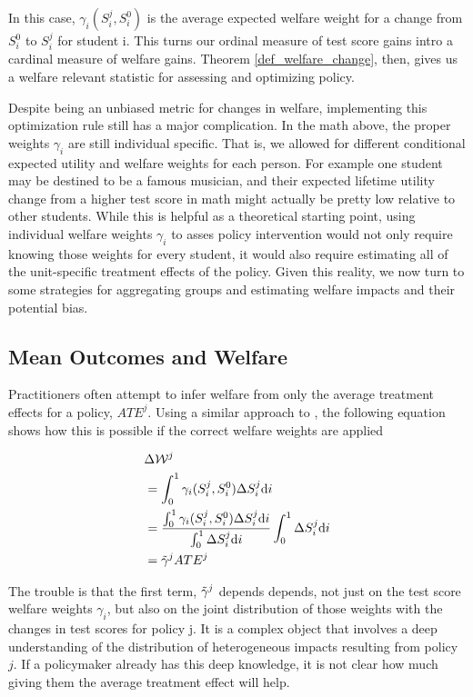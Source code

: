 \documentclass[12pt]{article}
\theoremstyle{definition}
\theoremstyle{definition}
\theoremstyle{definition}
\theoremstyle{definition}
\begin{document}
   
 
    In this case, $\gamma_i(S_i^j, S_i^0) $ is the average expected welfare weight for a change from $S_i^0$ to $S_i^j$ for student i. This turns our ordinal measure of test score gains intro a cardinal measure of welfare gains. Theorem \ref{def_welfare_change}, then, gives us a welfare relevant statistic for assessing and optimizing policy.

 Despite being an unbiased metric for changes in welfare, implementing this optimization rule still has a major complication. In the math above, the proper weights  $\gamma_i$ are still individual specific. That is, we allowed for different conditional expected utility and welfare weights for each person. For example one student may be destined to be a famous musician, and their expected lifetime utility change from a higher test score in math might actually be pretty low relative to other students. While this is helpful as a theoretical starting point, using individual welfare weights  $\gamma_i$ to asses policy intervention would not only require knowing those weights for every student, it would also require estimating all of the unit-specific treatment effects of the policy. Given this reality, we now turn to some strategies for aggregating groups and estimating welfare impacts and their potential bias. 
    
    
    \subsection{Mean Outcomes and Welfare}

    Practitioners often attempt to infer welfare from only the average treatment effects for a policy, $ATE^j$. Using a similar approach to  \cite{Keyser_2020}, the following equation shows how this is possible if the correct welfare weights are applied


    \begin{align}
           & \Delta \mathcal{W}^j \\
           &  = \int_0^1 \gamma_i(S_i^j, S_i^0) \Delta S^j_i \text{d}i\\
           & = \frac{\int_0^1 \gamma_i(S_i^j, S_i^0) \Delta S^j_i \text{d}i}{\int_0^1 \Delta S^j_i \text{d}i} \int_0^1 \Delta S^j_i \text{d}i \\
           & =  \Tilde{\gamma}^j ATE^j 
    \end{align}

    The trouble is that the first term, $\Tilde{\gamma}^j$ depends depends, not just on the test score welfare weights $\gamma_i$, but also on the joint distribution of those weights with the changes in test scores for policy j. It is a complex object that involves a deep understanding of the distribution of heterogeneous impacts resulting from policy $j$. If a policymaker already has this deep knowledge, it is not clear how much giving them the average treatment effect will help.
\end{document}
